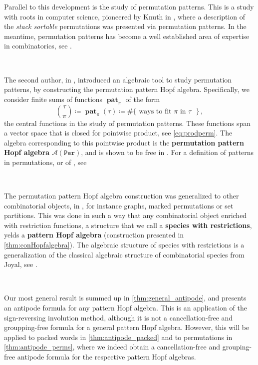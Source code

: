\documentclass[12pt, reqno]{amsart}
\theoremstyle{definition}
\DeclareMathOperator{\pat}{\mathbf{pat}}
\begin{document}
Parallel to this development is the study of permutation patterns.
This is a study with roots in computer science, pioneered by Knuth in \cite{Knuth}, where a description of the \textit{stack sortable} permutations was presented via permutation patterns.
In the meantime, permutation patterns has become a well established area of expertise in combinatorics, see \cite{linton2010permutation}.

\

The second author, in \cite{Vargas}, introduced an algebraic tool to study permutation patterns, by constructing the permutation pattern Hopf algebra.
Specifically, we consider finite sums of functions $\pat_{\pi}$ of the form 
$$ \binom{\tau}{\pi} \coloneqq \pat_{\pi}(\tau)\coloneqq  \#\{\text{ ways to fit $\pi$ in $\tau$ }\}\, ,$$
the central functions in the study of permutation patterns.
These functions span a vector space that is closed for pointwise product, see \eqref{eq:prodperm}.
The algebra corresponding to this pointwise product is the \textbf{permutation pattern Hopf algebra} $\mathcal{A}(\mathtt{Per})$, and is shown to be free in \cite{Vargas}.
For a definition of patterns in permutations, or of , see \cite{penaguiao2020algebraic}

\

The permutation pattern Hopf algebra construction was generalized to other combinatorial objects, in \cite{Penaguiao2020}, for instance graphs, marked permutations or set partitions.
This was done in such a way that any combinatorial object enriched with restriction functions, a structure that we call a \textbf{species with restrictions}, yelds a \textbf{pattern Hopf algebra} (construction presented in \cref{thm:conHopfalgebra}).
The algebraic structure of species with restrictions is a generalization of the classical algebraic structure of combinatorial species from Joyal, see \cite{AM2010}.


\

Our most general result is summed up in \cref{thm:general_antipode}, and presents an antipode formula for any pattern Hopf algebra.
This is an application of the sign-reversing involution method, although it is not a cancellation-free and groupping-free formula for a general pattern Hopf algebra.
However, this will be applied to packed words in \cref{thm:antipode_packed} and to permutations in \cref{thm:antipode_perms}, where we indeed obtain a cancellation-free and grouping-free antipode formula for the respective pattern Hopf algebras.
\end{document}
